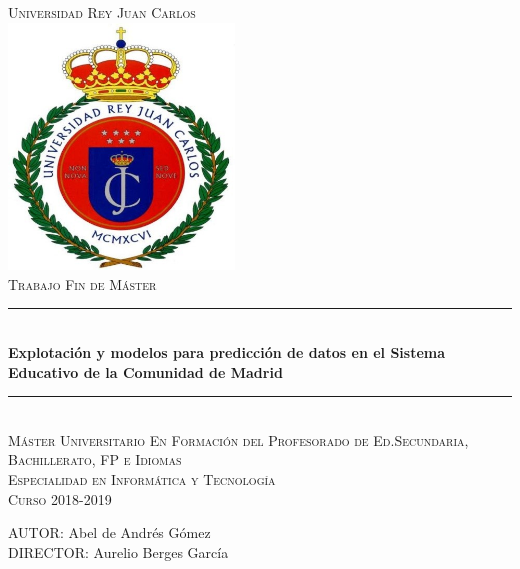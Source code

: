 \documentclass[spanish,12pt,a4paper,twoside,openright]{report}
\newcommand\blankpage{%
	\null
	\thispagestyle{empty}%
	\addtocounter{page}{-1}%
	\newpage}
\begin{document}
\begin{titlepage}
	
	\newcommand{\HRule}{\rule{\linewidth}{0.5mm}} %
	
	
	
	
	
	\center %
	\vspace*{0pt}
	\textsc{\huge Universidad Rey Juan Carlos }
	\\[1cm]
	
	\includegraphics[width=6cm]{recursos/escudo_urjc}
	\\[1cm]
	
	\textsc{\Large Trabajo Fin de Máster }\\[0.2cm]
	\HRule \\[0.4cm]
	{ \Huge \bfseries Explotación y modelos para predicción de datos en el Sistema Educativo de la Comunidad de Madrid}\\[0.2cm] %
	\HRule \\[1cm]
	
	\textsc{\Large Máster Universitario En Formación del Profesorado de Ed.Secundaria, Bachillerato, FP e Idiomas }\\[0.7cm]
	\textsc{\Large Especialidad en Informática y Tecnología }\\[1cm]
	\textsc{\Large Curso 2018-2019}\\[1cm]
	
	\begin{flushright}
		\large
		AUTOR: Abel de Andrés Gómez\\
		DIRECTOR: Aurelio Berges García\linebreak
	\end{flushright}
	
	
	\vfill %
	
\end{titlepage}
\blankpage
\end{document}
